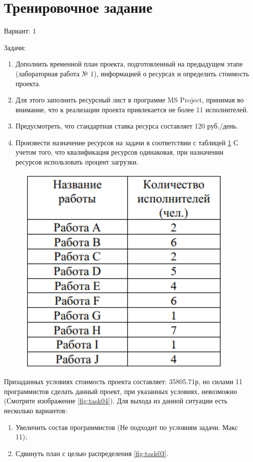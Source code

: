 \section{Тренировочное задание}

Вариант: 1

Задачи:
\begin{enumerate}
	\item Дополнить временной план проекта, подготовленный на предыдущем этапе (лабораторная работа № 1), информацией о ресурсах и определить стоимость проекта.
	\item Для этого заполнить ресурсный лист в программе MS Project, принимая во внимание, что к реализации проекта привлекается не более 11 исполнителей.
	\item Предусмотреть, что стандартная ставка ресурса составляет 120 руб./день.
	\item Произвести назначение ресурсов на задачи в соответствии с таблицей \ref{fig:task01} С учетом того, что квалификация ресурсов одинаковая, при назначении ресурсов использовать процент загрузки.
\end{enumerate}

\begin{figure}[H]
	\centering
	\includegraphics[width=0.7\linewidth]{task0_1}
	\caption{}
	\label{fig:task01}
\end{figure}

Призаданных условиях стоимость проекта составляет: 35805.71р, но силами 11 программистов сделать данный проект, при указанных условиях, невозможно (Смотрите изображение \ref{fig:task04}). Для выхода из данной ситуации есть несколько вариантов:
\begin{enumerate}
	\item Увеличить состав программистов (Не подходит по условиям задачи. Макс 11);
	\item Сдвинуть план с целью распределения \ref{fig:task03}.
\end{enumerate}

